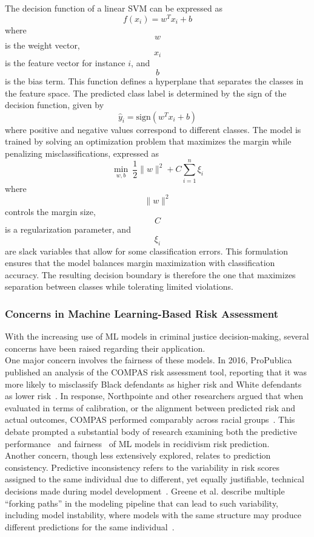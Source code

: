 \documentclass[12pt]{article}
\begin{document}
\begin{enumerate}
    The decision function of a linear SVM can be expressed as \[ f(x_i) = w^T x_i + b \] where \[ w \] is the weight vector, \[ x_i \] is the feature vector for instance \(i\), and \[ b \] is the bias term. This function defines a hyperplane that separates the classes in the feature space. The predicted class label is determined by the sign of the decision function, given by \[ \hat{y}_i = \text{sign}(w^T x_i + b) \] where positive and negative values correspond to different classes. The model is trained by solving an optimization problem that maximizes the margin while penalizing misclassifications, expressed as \[ \min_{w,b} \ \frac{1}{2} \|w\|^2 + C \sum_{i=1}^{n} \xi_i \] where \[ \|w\|^2 \] controls the margin size, \[ C \] is a regularization parameter, and \[ \xi_i \] are slack variables that allow for some classification errors. This formulation ensures that the model balances margin maximization with classification accuracy. The resulting decision boundary is therefore the one that maximizes separation between classes while tolerating limited violations.\\ 
\end{enumerate}

\subsubsection{Concerns in Machine Learning-Based Risk Assessment}
\tab With the increasing use of ML models in criminal justice decision-making, several concerns have been raised regarding their application.\\

One major concern involves the fairness of these models. In 2016, ProPublica published an analysis of the COMPAS risk assessment tool, reporting that it was more likely to misclassify Black defendants as higher risk and White defendants as lower risk~\cite{propublica2016analysis}. In response, Northpointe and other researchers argued that when evaluated in terms of calibration, or the alignment between predicted risk and actual outcomes, COMPAS performed comparably across racial groups~\cite{dieterich2016compas, corbett2017algorithmic, flores2016false}. This debate prompted a substantial body of research examining both the predictive performance~\cite{duwe2017out, travaini2022machine, tollenaar2013method} and fairness~\cite{ tolan2019machine, dressel2018accuracy,ngo2018traditional} of ML models in recidivism risk prediction.\\

Another concern, though less extensively explored, relates to prediction consistency. Predictive inconsistency refers to the variability in risk scores assigned to the same individual due to different, yet equally justifiable, technical decisions made during model development~\cite{greene2022forks}. Greene et al. describe multiple ``forking paths'' in the modeling pipeline that can lead to such variability, including model instability, where models with the same structure may produce different predictions for the same individual~\cite{greene2022forks}.
\end{document}
